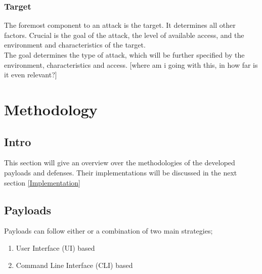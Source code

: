 \subsubsection{Target}

The foremost component to an attack is the target. It determines all other factors. Crucial is the goal of the attack, the level of available access, and the environment and characteristics of the target.\\
The goal determines the type of attack, which will be further specified by the environment, characteristics and access. [where am i going with this, in how far is it even relevant?] 


\section{Methodology} \label{methodology}

\subsection{Intro}

This section will give an overview over the methodologies of the developed payloads and defenses. Their implementations will be discussed in the next section \ref{Implementation}


\subsection{Payloads}

Payloads can follow either or a combination of two main strategies; 
\begin{enumerate}
    \item User Interface (UI) based
    \item Command Line Interface (CLI) based
\end{enumerate}

